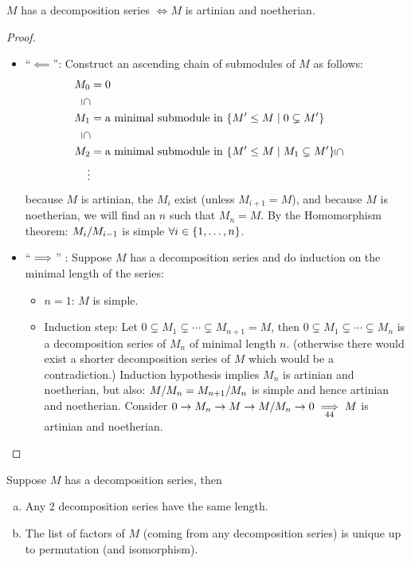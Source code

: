 \documentclass[a4paper]{report}
\begin{document}
\begin{prop}
$M$ has a decomposition series $\iff M$ is artinian and noetherian.
\begin{proof}
\begin{itemize}
  \item ``$\impliedby$'': Construct an ascending chain of submodules of $M$ as follows:
        \begin{align*}
          M_{0} &= 0 \\
          \rotatebox[origin=c]{270}{$\subseteq$}&\  \\
          M_{1} &= \text{a minimal submodule in } \{M' \le M \mid 0 \subsetneq M'\} \\
          \rotatebox[origin=c]{270}{$\subseteq$}&\  \\
          M_{2} &= \text{a minimal submodule in } \{M' \le M \mid M_{1} \subsetneq M'\}
          \rotatebox[origin=c]{270}{$\subseteq$}&\  \\
          \vdots  \\
        \end{align*}
        because $M$ is artinian, the $M_{i}$ exist (unless $M_{i+1} = M$), and because $M$ is noetherian, we will find an $n$ such that $M_{n} = M$. By the Homomorphism theorem: $\fak {M_{i}}{M_{i-1}}$ is simple $\forall i \in \{1, \ldots, n\}$.
  \item ``$\implies$'' : Suppose $M$ has a decomposition series and do induction on the minimal length of the series:
        \begin{itemize}
          \item $n = 1$: $M$ is simple.
                \item Induction step: Let $0 \subsetneq M_{1} \subsetneq \cdots \subsetneq M_{n+1} = M$, then $0 \subsetneq M_{1} \subsetneq \cdots \subsetneq M_{n}$ is a decomposition series of $M_{n}$ of minimal length $n$. (otherwise there would exist a shorter decomposition series of $M$ which would be a contradiction.) Induction hypothesis implies $M_{n}$ is artinian and noetherian, but also: $\fak M{M_{n}} = \fak {M_{n+1}}{M_{n}}$ is simple and hence artinian and noetherian. Consider $0 \to M_{n} \to M \to \fak M{M_{n}} \to 0 \underset{44}\imp M$ is artinian and noetherian. \qedhere
        \end{itemize}
\end{itemize}
\end{proof}
\end{prop}

\begin{thm}
  Suppose $M$ has a decomposition series, then
  \begin{enumerate}[(a)]
    \item Any 2 decomposition series have the same length.
          \item The list of factors of $M$ (coming from any decomposition series) is unique up to  permutation (and isomorphism).
  \end{enumerate}
\end{thm}
\end{document}
